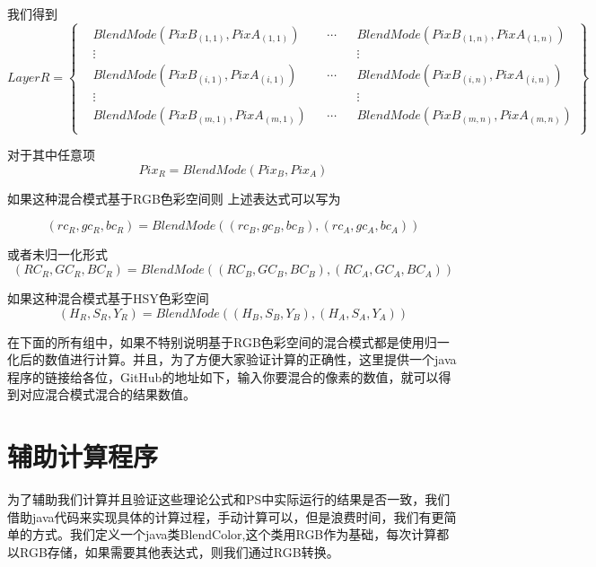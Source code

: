 我们得到
\begin{equation}LayerR=\left\{ \begin{aligned}   &BlendMode(PixB_{(1,1)},PixA_{(1,1)})&&\cdots&&BlendMode(PixB_{(1,n)},PixA_{(1,n)})\\&\vdots && &&\vdots\\&BlendMode(PixB_{(i,1)},PixA_{(i,1)})&&\cdots&&BlendMode(PixB_{(i,n)},PixA_{(i,n)})\\&\vdots && &&\vdots\\&BlendMode(PixB_{(m,1)},PixA_{(m,1)})&&\cdots&&BlendMode(PixB_{(m,n)},PixA_{(m,n)})\\\end{aligned}\right\}\end{equation}

\indent 对于其中任意项
\begin{equation}
	Pix_R=BlendMode(Pix_B,Pix_A)
\end{equation}

 如果这种混合模式基于RGB色彩空间则
上述表达式可以写为

\begin{equation}
	(rc_{R},gc_{R},bc_{R})=BlendMode((rc_{B},gc_{B},bc_{B}),(rc_{A},gc_{A},bc_{A}))
\end{equation}

或者未归一化形式
\begin{equation}
	(RC_{R},GC_{R},BC_{R})=BlendMode((RC_{B}, GC_{B}, BC_{B}),(RC_{A}, GC_{A}, BC_{A}))
\end{equation}

如果这种混合模式基于HSY色彩空间
\begin{equation}
	(H_{R},S_{R},Y_{R})=BlendMode((H_{B},S_{B},Y_{B}),(H_{A},S_{A},Y_{A}))
\end{equation}

\begin{notice}
	\item 在下面的所有组中，如果不特别说明基于RGB色彩空间的混合模式都是使用归一化后的数值进行计算。并且，为了方便大家验证计算的正确性，这里提供一个java程序的链接给各位，GitHub的地址如下，输入你要混合的像素的数值，就可以得到对应混合模式混合的结果数值。
\end{notice} 
\newpage
\section{ 辅助计算程序}
为了辅助我们计算并且验证这些理论公式和PS中实际运行的结果是否一致，我们借助java代码来实现具体的计算过程，手动计算可以，但是浪费时间，我们有更简单的方式。我们定义一个java类BlendColor,这个类用RGB作为基础，每次计算都以RGB存储，如果需要其他表达式，则我们通过RGB转换。


